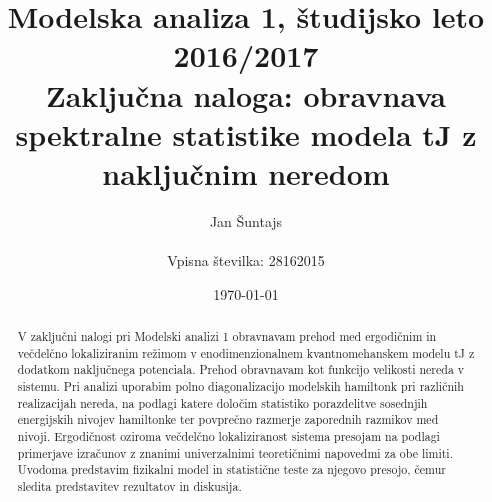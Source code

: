\documentclass[10pt,a4paper]{article}
\author{\normalsize Jan Šuntajs\\ \\\vspace{2mm}
\normalsize Vpisna številka: 28162015}
\title{\large Modelska analiza 1, študijsko leto 2016/2017 \\ 
\vspace{3mm}
\Large Zaključna naloga: obravnava spektralne statistike modela tJ z naključnim neredom}
\date{\normalsize \today}
\begin{document}
\maketitle
\begin{abstract}
V zaključni nalogi pri Modelski analizi 1 obravnavam prehod med ergodičnim in večdelčno lokaliziranim  režimom v enodimenzionalnem kvantnomehanskem modelu tJ z dodatkom naključnega potenciala. Prehod obravnavam kot funkcijo velikosti nereda v sistemu.  Pri analizi uporabim polno diagonalizacijo modelskih hamiltonk pri različnih realizacijah nereda, na podlagi katere določim statistiko porazdelitve sosednjih energijskih nivojev hamiltonke ter povprečno razmerje zaporednih razmikov med nivoji. Ergodičnost oziroma večdelčno lokaliziranost sistema presojam na podlagi primerjave izračunov z znanimi univerzalnimi teoretičnimi napovedmi za obe limiti. Uvodoma predstavim fizikalni model in statistične teste za njegovo presojo, čemur sledita predstavitev rezultatov in diskusija. 
\end{abstract}
\end{document}
